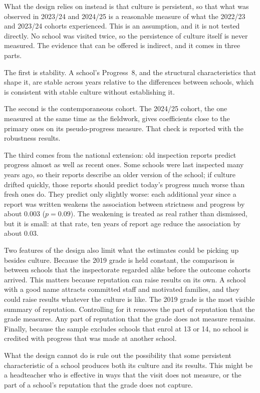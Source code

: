 What the design relies on instead is that culture is persistent, so that
what was observed in 2023/24 and 2024/25 is a reasonable measure of what
the 2022/23 and 2023/24 cohorts experienced. This is an assumption, and it is not tested directly. No school was visited twice, so the persistence of culture itself is never measured. The evidence that can be offered is indirect, and it comes in three parts.

The first is stability. A school's
Progress~8, and the structural characteristics that shape it, are stable
across years relative to the differences between schools, which is consistent with stable culture without establishing it.

The second is the contemporaneous cohort. The 2024/25 cohort, the one measured at the same time as the fieldwork, gives coefficients close to the primary ones on its pseudo-progress measure. That check is reported with the robustness results.

The third comes from the national extension: old inspection reports predict progress almost as well as recent ones. Some schools were last inspected many years ago, so their reports describe an older version of the school; if culture drifted quickly, those reports should predict today's progress much worse than fresh ones do. They predict only slightly worse: each additional year since a report was written weakens the association between strictness and progress by about $0.003$ ($p = 0.09$). The weakening is treated as real rather than dismissed, but it is small: at that rate, ten years of report age reduce the association by about $0.03$.

Two features of the design also limit what the estimates could be picking up besides culture. Because the 2019 grade is held constant, the comparison is between schools that the inspectorate regarded alike before the outcome cohorts arrived. This matters because reputation can raise results on its own. A school with a good name attracts committed staff and motivated families, and they could raise results whatever the culture is like. The 2019 grade is the most visible summary of reputation. Controlling for it removes the part of reputation that the grade measures. Any part of reputation that the grade does not measure remains. Finally, because the sample excludes schools that enrol at 13 or 14, no
school is credited with progress that was made at another school.

What the design cannot do is rule out the possibility that some persistent
characteristic of a school produces both its culture and its results. This might be a headteacher who is effective in ways that the visit does not measure, or the part of a school's reputation that the grade does not capture.

